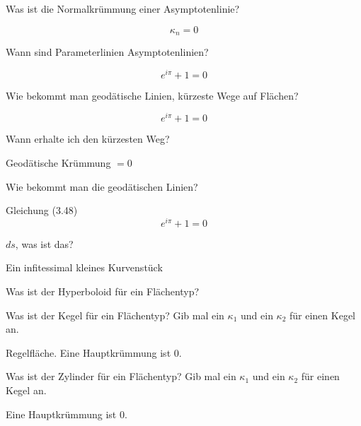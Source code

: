 \documentclass[twocolumn, fontsize=8pt, DIV=1]{scrartcl}
\begin{document}
\begin{framed}
    Was ist die Normalkrümmung einer Asymptotenlinie?
\end{framed}
\[
    \kappa_n = 0
\]



\begin{framed}
    Wann sind Parameterlinien Asymptotenlinien?
\end{framed}
\[
    e^{i\pi} + 1 = 0
\]



\begin{framed}
    Wie bekommt man geodätische Linien, kürzeste Wege auf Flächen?
\end{framed}
\[
    e^{i\pi} + 1 = 0
\]



\begin{framed}
    Wann erhalte ich den kürzesten Weg?
\end{framed}
Geodätische Krümmung $= 0$



\begin{framed}
    Wie bekommt man die geodätischen Linien?
\end{framed}
Gleichung (3.48)
\[
    e^{i\pi} + 1 = 0
\]



\begin{framed}
    $ds$, was ist das?
\end{framed}
Ein infitessimal kleines Kurvenstück



\begin{framed}
    Was ist der Hyperboloid für ein Flächentyp?
\end{framed}
\todo[inline]{}



\begin{framed}
    Was ist der Kegel für ein Flächentyp? Gib mal ein $\kappa_1$ und ein $\kappa_2$ für einen Kegel an.
\end{framed}
Regelfläche. Eine Hauptkrümmung ist $0$.



\begin{framed}
    Was ist der Zylinder für ein Flächentyp? Gib mal ein $\kappa_1$ und ein $\kappa_2$ für einen Kegel an.
\end{framed}
Eine Hauptkrümmung ist $0$.
\end{document}
